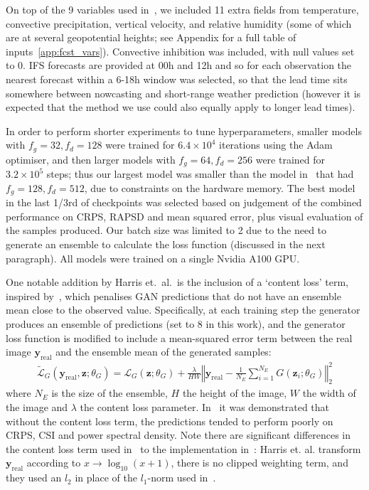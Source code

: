 \documentclass[../main.tex]{subfiles}
\begin{document}
 On top of the 9 variables used in~\cite{harris_generative_2022}, we included 11 extra fields from temperature, convective precipitation, vertical velocity, and relative humidity (some of which are at several geopotential heights; see Appendix for a full table of inputs~\ref{app:fcst_vars}). Convective inhibition was included, with null values set to 0. IFS forecasts are provided at 00h and 12h and so for each observation the nearest forecast within a 6-18h window was selected, so that the lead time sits somewhere between nowcasting and short-range weather prediction (however it is expected that the method we use could also equally apply to longer lead times).

 In order to perform shorter experiments to tune hyperparameters, smaller models with $f_g=32, f_d=128$ were trained for $6.4\times 10^4$ iterations using the Adam optimiser, and then larger models with $f_g=64, f_d=256$ were trained for $3.2\times10^5$ steps; thus our largest model was smaller than the model in~\cite{harris_generative_2022} that had $f_g=128, f_d=512$, due to constraints on the hardware memory. The best model in the last 1/3rd of checkpoints was selected based on judgement of the combined performance on CRPS, RAPSD and mean squared error, plus visual evaluation of the samples produced. Our batch size was limited to 2 due to the need to generate an ensemble to calculate the loss function (discussed in the next paragraph). All models were trained on a single Nvidia A100 GPU.

One notable addition by Harris et.~al.~is the inclusion of a `content loss' term, inspired by~\cite{ravuri_skilful_2021}, which penalises GAN predictions that do not have an ensemble mean close to the observed value. Specifically, at each training step the generator produces an ensemble of predictions (set to 8 in this work), and the generator loss function is modified to include a mean-squared error term between the real image $\mathbf{y}_{\text{real}}$ and the ensemble mean of the generated samples:
\begin{align}
\label{eq:content_loss}
\tilde{\mathcal{L}}_G(\mathbf{y}_{\text{real}}, \mathbf{z}; \theta_G) = \mathcal{L}_G(\mathbf{z}; \theta_G) + \frac{\mathcal{\lambda}}{HW} \left\Vert \mathbf{y}_{\text{real}} - \frac{1}{N_E} \sum_{i=1}^{N_E} G(\mathbf{z}_i;\theta_G) \right\Vert_2^2
\end{align}
where $N_E$ is the size of the ensemble, $H$ the height of the image, $W$ the width of the image and $\lambda$ the content loss parameter. In~\cite{ravuri_skilful_2021} it was demonstrated that without the content loss term, the predictions tended to perform poorly on CRPS, CSI and power spectral density. Note there are significant differences in the content loss term used in~\cite{harris_generative_2022} to the implementation in~\cite{ravuri_skilful_2021}: Harris et. al. transform $\mathbf{y}_{\text{real}}$ according to $x \to \log_{10}(x+1)$, there is no clipped weighting term, and they used an $l_2$ in place of the $l_1$-norm used in~\cite{ravuri_skilful_2021}. 
\end{document}
